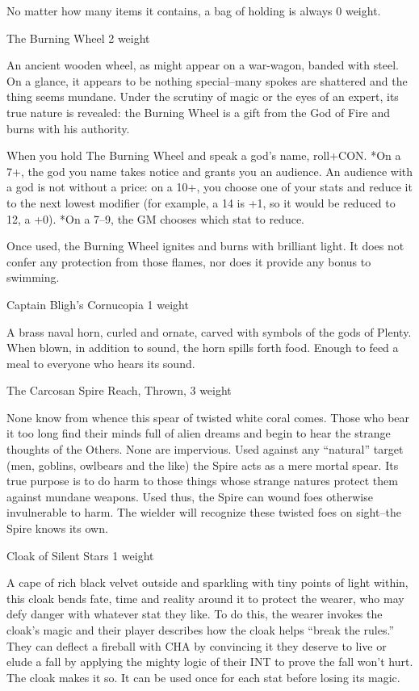  No matter how many items it contains, a bag of holding is always 0 weight.


 The Burning Wheel 2 weight


 An ancient wooden wheel, as might appear on a war-wagon, banded with steel. On a glance, it appears to be nothing special--many spokes are shattered and the thing seems mundane. Under the scrutiny of magic or the eyes of an expert, its true nature is revealed: the Burning Wheel is a gift from the God of Fire and burns with his authority.


 When you hold The Burning Wheel and speak a god's name, roll+CON. *On a 7+, the god you name takes notice and grants you an audience. An audience with a god is not without a price: on a 10+, you choose one of your stats and reduce it to the next lowest modifier (for example, a 14 is +1, so it would be reduced to 12, a +0). *On a 7--9, the GM chooses which stat to reduce.


 Once used, the Burning Wheel ignites and burns with brilliant light. It does not confer any protection from those flames, nor does it provide any bonus to swimming.


 Captain Bligh's Cornucopia 1 weight


 A brass naval horn, curled and ornate, carved with symbols of the gods of Plenty. When blown, in addition to sound, the horn spills forth food. Enough to feed a meal to everyone who hears its sound.


 The Carcosan Spire Reach, Thrown, 3 weight


 None know from whence this spear of twisted white coral comes. Those who bear it too long find their minds full of alien dreams and begin to hear the strange thoughts of the Others. None are impervious. Used against any ``natural'' target (men, goblins, owlbears and the like) the Spire acts as a mere mortal spear. Its true purpose is to do harm to those things whose strange natures protect them against mundane weapons. Used thus, the Spire can wound foes otherwise invulnerable to harm. The wielder will recognize these twisted foes on sight--the Spire knows its own.


 Cloak of Silent Stars 1 weight


 A cape of rich black velvet outside and sparkling with tiny points of light within, this cloak bends fate, time and reality around it to protect the wearer, who may defy danger with whatever stat they like. To do this, the wearer invokes the cloak's magic and their player describes how the cloak helps ``break the rules.'' They can deflect a fireball with CHA by convincing it they deserve to live or elude a fall by applying the mighty logic of their INT to prove the fall won't hurt. The cloak makes it so. It can be used once for each stat before losing its magic.



